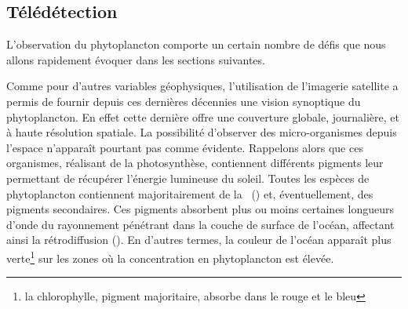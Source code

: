 \begin{figure}
  \centering
  \label{fig:pompe-bio}
\end{figure}

\subsection{Télédétection}
\label{sec:teledetection}

L'observation du phytoplancton comporte un certain nombre de défis que nous allons rapidement évoquer dans les sections suivantes.

Comme pour d'autres variables géophysiques, l'utilisation de l'imagerie satellite a permis de fournir depuis ces dernières décennies une vision synoptique du phytoplancton.
En effet cette dernière offre une couverture globale, journalière, et à haute résolution spatiale.
La possibilité d'observer des micro-organismes depuis l'espace n'apparaît pourtant pas comme évidente.
Rappelons alors que ces organismes, réalisant de la photosynthèse, contiennent différents pigments leur permettant de récupérer l'énergie lumineuse du soleil.
Toutes les espèces de phytoplancton contiennent majoritairement de la ~() et, éventuellement, des pigments secondaires.
Ces pigments absorbent plus ou moins certaines longueurs d'onde du rayonnement pénétrant dans la couche de surface de l'océan, affectant ainsi la rétrodiffusion ().
En d'autres termes, la couleur de l'océan apparaît plus verte\footnote{%
  la chlorophylle, pigment majoritaire, absorbe dans le rouge et le bleu}
sur les zones où la concentration en phytoplancton est élevée.

